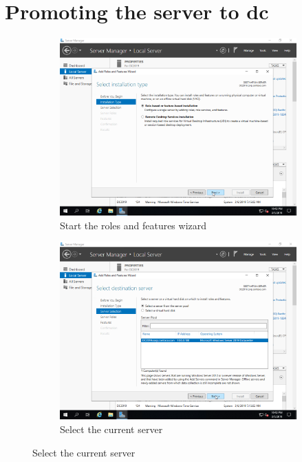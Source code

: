 \section{Promoting the server to \acrshort{dc}}
\begin{figure}[!htb]
	\begin{subfigure}{0.5\textwidth}
		\captionsetup{width=0.8\linewidth}
		\includegraphics[width=0.9\linewidth]{img/Methodologie/Migration15.png}
		\centering
		\caption{Start the roles and features wizard}
	\end{subfigure}
	\begin{subfigure}{0.5\textwidth}
		\captionsetup{width=0.8\linewidth}
		\includegraphics[width=0.9\linewidth]{img/Methodologie/Migration16.png} 
		\centering
		\caption{Select the current server}
	\end{subfigure}
\end{figure}
